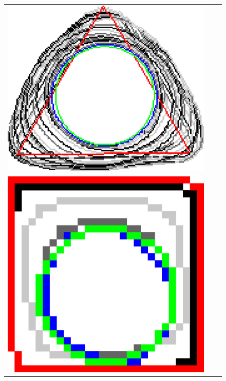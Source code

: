 \begin{figure}[hp!]
\begin{tabular}{ccc}
	\includegraphics[scale=0.185]{figures/chapter5/flow/triangle/radius_5/ii/elastica/len_pen_0.01000/jonctions_1/best/gs_0.25000/summary.pdf}\\[2em]
		
	\includegraphics[scale=0.17]{figures/chapter5/flow/square/radius_5/ii/elastica/len_pen_0.01000/jonctions_1/best/gs_1.00000/summary.pdf} &
	

\end{tabular}
\end{figure}
